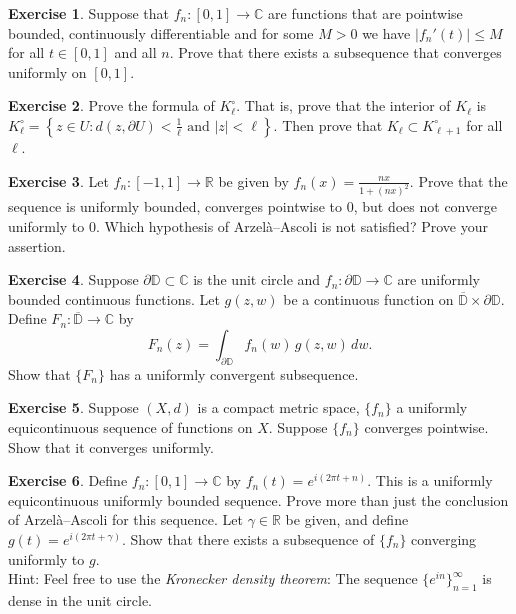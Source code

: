 \documentclass[12pt,openany]{book}
\newcommand{\sabs}[1]{\lvert {#1} \rvert}
\newcommand{\C}{{\mathbb{C}}}
\newcommand{\R}{{\mathbb{R}}}
\newcommand{\D}{{\mathbb{D}}}
\newcommand{\myindex}[1]{#1\index{#1}}
\theoremstyle{plain}
\theoremstyle{remark}
\theoremstyle{definition}
\newenvironment{exbox}{%
    \def\FrameCommand{\vrule width 1pt \relax\hspace{10pt}}%
    \MakeFramed{\advance\hsize-\width\FrameRestore}%
}{%
    \endMakeFramed
}
\theoremstyle{exercise}
\newtheorem{exercise}{Exercise}[section]
\theoremstyle{example}
\begin{document}
\begin{exbox}
\begin{exercise}
Suppose that $f_n \colon [0,1] \to \C$ are functions that are pointwise
bounded, continuously differentiable and for some $M> 0$ we have
$\sabs{f_n'(t)} \leq M$ for all $t \in [0,1]$ and all $n$.  Prove that there
exists a subsequence that converges uniformly on $[0,1]$.
\end{exercise}

\begin{exercise}
Prove the formula of $K^\circ_\ell$.  That is, prove that the interior
of $K_\ell$ is
$K^\circ_\ell = \left\{
z \in U : d(z,\partial U) < \frac{1}{\ell} \text{ and } \sabs{z} < \ell
\right\}$.  Then prove that $K_\ell \subset K^\circ_{\ell+1}$ for all $\ell$.
\end{exercise}

\begin{exercise}
Let $f_n \colon [-1,1] \to \R$ be given by $f_n(x) = \frac{nx}{1+{(nx)}^2}$.
Prove that the sequence is uniformly bounded, converges pointwise to 0, but
does not converge uniformly to 0.
Which hypothesis of Arzel\`a--Ascoli
is not satisfied?  Prove your assertion.
\end{exercise}

\begin{exercise}
Suppose $\partial \D \subset \C$ is the unit circle
and
$f_n \colon \partial \D \to \C$ are uniformly bounded continuous functions.
Let $g(z,w)$ be a continuous function on $\overline{\D} \times \partial \D$.
Define
$F_n \colon \overline{\D} \to \C$ by
\begin{equation*}
F_n(z)  = \int_{\partial \D} f_n(w)\, g(z,w) \, dw . 
\end{equation*}
Show that $\{ F_n \}$ has a uniformly convergent subsequence.
\end{exercise}

\begin{exercise}
Suppose $(X,d)$ is a compact metric space, $\{ f_n \}$ a uniformly equicontinuous
sequence of functions on $X$.  Suppose $\{ f_n \}$ converges
pointwise.  Show that it converges uniformly.
\end{exercise}

\begin{exercise}
Define $f_n \colon [0,1] \to \C$ by $f_n(t) = e^{i(2\pi t + n)}$.
This is a uniformly equicontinuous uniformly bounded sequence.
Prove more than just
the conclusion of Arzel\`a--Ascoli for this sequence.  Let $\gamma \in \R$
be given,
and define $g(t) = e^{i(2\pi t + \gamma)}$.  Show that there exists 
a subsequence of $\{ f_n \}$ converging uniformly to $g$.
\\
Hint: Feel free to use the \emph{\myindex{Kronecker density theorem}}:
The sequence $\{ e^{in} \}_{n=1}^\infty$ is dense in the unit circle.
\end{exercise}
\end{exbox}
\end{document}
